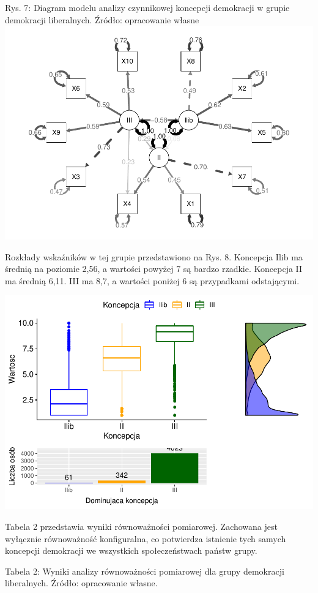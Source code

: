 \documentclass[12pt]{article}
\begin{document}
Rys. 7: Diagram modelu analizy czynnikowej koncepcji demokracji w grupie demokracji liberalnych. Źródło: opracowanie własne
\includegraphics{text_ASA_files/figure-latex/diagram-west-1.pdf}

Rozkłady wskaźników w tej grupie przedstawiono na Rys. 8. Koncepcja Ilib ma średnią na poziomie 2,56, a wartości powyżej 7 są bardzo rzadkie. Koncepcja II ma średnią 6,11. III ma 8,7, a wartości poniżej 6 są przypadkami odstającymi.

\includegraphics{text_ASA_files/figure-latex/stats-west-1.pdf}

Tabela 2 przedstawia wyniki równoważności pomiarowej. Zachowana jest wyłącznie równoważność konfiguralna, co potwierdza istnienie tych samych koncepcji demokracji we wszystkich społeczeństwach państw grupy.

Tabela 2: Wyniki analizy równoważności pomiarowej dla grupy demokracji liberalnych. Źródło: opracowanie własne.
\end{document}
